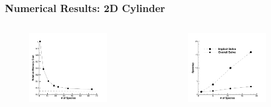 \documentclass{beamer}
\begin{document}
\begin{frame}
  \frametitle{Numerical Results: 2D Cylinder}
  \begin{columns}[t]
    \begin{column}{0.5\textwidth}
    \begin{figure}[h]
      \centering
      \includegraphics[width=0.8\textwidth,trim={0 0 1cm 2.5cm}]{figures/mem_req}
    \end{figure}
    \end{column}
    \begin{column}{0.5\textwidth}
      \begin{figure}[h]
        \centering
        \includegraphics[width=0.8\textwidth,trim={1cm 0 0 2.5cm}]{figures/speedup} 
      \end{figure}
    \end{column}

\end{columns}
\end{frame}
\end{document}
